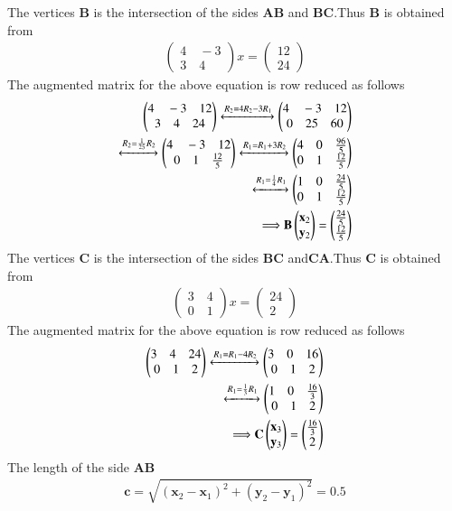 \documentclass[journal,12pt,twocolumn]{IEEEtran}
\newcommand{\myvec}[1]{\ensuremath{\begin{pmatrix}#1\end{pmatrix}}}
\numberwithin{equation}{subsection}
\let\vec\mathbf
\begin{document}
  The vertices $\vec{B}$ is the intersection of the sides $\vec{AB}$ and $\vec{BC}$.Thus $\vec{B}$ is obtained from
 \begin{align}
 \myvec{4\quad-3\\3\quad4}x=\myvec{12\\24}
 \end{align}
 The augmented matrix for the above equation is row reduced as follows
 \begin{align}
 \myvec{4\quad-3\quad 12\\3\quad4\quad24}\xleftrightarrow{R_2=4R_2-3R_1}\myvec{4\quad-3\quad 12\\0\quad25\quad60}\\\xleftrightarrow{R_2=\frac{1}{25}R_2}\myvec{4\quad-3\quad 12\\0\quad1\quad\frac{12}{5}}\xleftrightarrow{R_1=R_1+3R_2}\myvec{4\quad0\quad\frac{96}{5}\\0\quad1\quad\frac{12}{5}}\\
 \xleftrightarrow{R_1=\frac{1}{4}R_1}\myvec{1\quad0\quad\frac{24}{5}\\0\quad1\quad\frac{12}{5}}\\
 \Longrightarrow\vec{B}\myvec{\vec{x}_2 \\\vec{y}_2}=\myvec{\frac{24}{5}\\\frac{12}{5}}
 \end{align}
 The vertices $\vec{C}$ is the intersection of the sides $\vec{BC}$ and$\vec{CA}$.Thus $\vec{C}$ is obtained from
 \begin{align}
 \myvec{3\quad4\\0\quad 1}x=\myvec{24\\2}
 \end{align}
 The augmented matrix for the above equation is row reduced as follows
\begin{align}
 \myvec{3\quad4\quad 24\\0\quad1\quad2}\xleftrightarrow{R_1=R_1-4R_2}\myvec{3\quad0\quad 16\\0\quad1\quad2}\\\xleftrightarrow{R_1=\frac{1}{3}R_1}\myvec{1\quad0\quad\frac{16}{3}\\0\quad1\quad2}\\
 \Longrightarrow\vec{C}\myvec{\vec{x}_3 \\\vec{y}_3}=\myvec{\frac{16}{3}\\2}
 \end{align}
 The length of the side $\vec{AB}$
 \begin{align}
 \vec{c}=\sqrt{(\vec{x}_2-\vec{x}_1)^2+(\vec{y}_2-\vec{y}_1)^2}=0.5
 \end{align}
\end{document}
